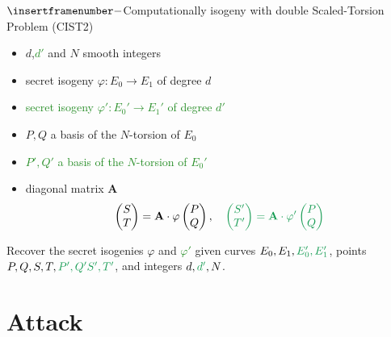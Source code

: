 \documentclass[10pt]{beamer}
\def\mcolor {ForestGreen}
\theoremstyle{plain}
\theoremstyle{example}
\begin{document}
\begin{frame}{$\insertframenumber -$Computationally isogeny with double Scaled-Torsion Problem (CIST2)}
	\begin{itemize}
		\item $d$,\textcolor{\mcolor}{$d'$} and $N$ smooth integers
		\item secret isogeny $\varphi:E_0\to E_1$ of degree $d$ 
		\item \textcolor{\mcolor}{secret isogeny $\varphi':E_0'\to E_1'$ of degree $d'$}
		\item $P,Q$ a basis of the $N$-torsion of $E_0$
		\item \textcolor{\mcolor}{$P',Q'$ a basis of the $N$-torsion of $E_0'$}
		\item diagonal matrix $\mathbf A$
			\[
			\begin{pmatrix} S \\ T \end{pmatrix} = \mathbf A \cdot\varphi
			\begin{pmatrix} P \\ Q \end{pmatrix}, 
			\quad
			\textcolor{\mcolor}{
			\begin{pmatrix} S' \\ T' \end{pmatrix} = \mathbf A \cdot\varphi'
			\begin{pmatrix} P \\ Q \end{pmatrix} 
		}
			\] 
	\end{itemize}
	\begin{problem}
		Recover the secret isogenies $\varphi$ and \textcolor{\mcolor}{$\varphi'$} given
		curves $E_0,E_1,\textcolor{\mcolor}{E_0',E_1'}$, points
		$P,Q,S,T,\textcolor{\mcolor}{P',Q'S',T'}$, and integers
		$d,\textcolor{\mcolor}{d'},N$.
	\end{problem}
\end{frame}

\section{Attack}
\end{document}
